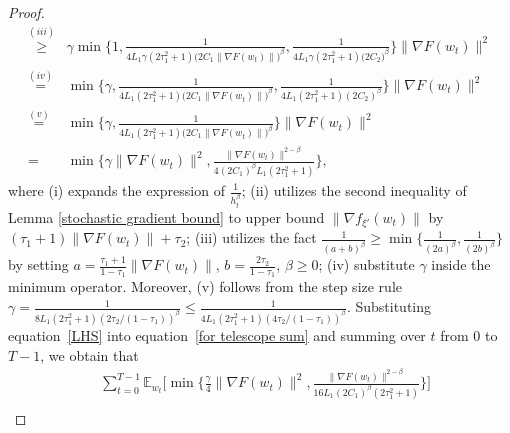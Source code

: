 \documentclass[10pt]{article} %
\def\eqref#1{equation~\ref{#1}}
\newtheorem{proof}{Proof}
\begin{document}
\begin{proof}
\begin{align}
    \overset{(iii)}{\geq}& \gamma \min \Big\{1,\frac{1}{4L_1\gamma(2\tau_1^2+1) \big(2C_1\big \|\nabla F(w_t) \big \|\big)^{\beta}}, \frac{1}{4L_1\gamma(2\tau_1^2+1)\big( 2C_2\big)^{\beta}}  \Big \} \big \|\nabla F(w_t) \big \|^2 \nonumber \\
    \overset{(iv)}{=}&\min \Big \{\gamma, \frac{1}{4L_1(2\tau_1^2+1)\big(2C_1\big \|\nabla F(w_t) \big \|\big)^{\beta}}, \frac{1}{4L_1(2\tau_1^2+1)(2C_2)^{\beta}} \Big\} \big \|\nabla F(w_t) \big \|^2 \nonumber \\
    \overset{(v)}{=}& \min \Big \{\gamma, \frac{1}{4L_1(2\tau_1^2+1)\big(2C_1\big \|\nabla F(w_t) \big \|\big)^{\beta}} \Big\} \big \|\nabla F(w_t) \big \|^2 \nonumber \\
    \overset{}{=}& \min \Big \{ \gamma \big \|\nabla F(w_t) \big \|^2, \frac{\big \|\nabla F(w_t) \big \|^{2-\beta}}{4(2C_1)^{\beta} L_1(2\tau_1^2+1)}\Big \},
    \label{LHS}
\end{align}
where (i) expands the expression of $\frac{1}{h_t^{\beta}}$; (ii) utilizes the second inequality of Lemma \ref{stochastic gradient bound} to upper bound $\|\nabla f_{\xi'}(w_t) \|$ by $(\tau_1+1) \|\nabla F(w_t) \|+\tau_2$; (iii) utilizes the fact $ \frac{1}{(a+b)^{\beta}}\geq \min \{\frac{1}{(2a)^{\beta}}, \frac{1}{(2b)^{\beta}} \}$ by setting $a=\frac{\tau_1+1}{1-\tau_1}\big \|\nabla F(w_t) \big \|$, $b = \frac{2\tau_2}{1-\tau_1}$, $\beta\geq0$; (iv) substitute $\gamma$ inside the minimum operator. 
Moreover, (v) follows from the step size rule $\gamma= \frac{1}{8L_1(2\tau_1^2+1)(2\tau_2/(1-\tau_1))^{\beta}}\leq \frac{1}{4L_1(2\tau_1^2+1)(4\tau_2/(1-\tau_1))^{\beta}}$. 
Substituting \eqref{LHS} into \eqref{for telescope sum}
and summing over $t$ from $0$ to $T-1$, we obtain that
\begin{align}
        &\sum_{t=0}^{T-1} \mathbb{E}_{w_t}\Big[\min \Big \{ \frac{\gamma}{4} \big \|\nabla F(w_t) \big \|^2, \frac{\big \|\nabla F(w_t) \big \|^{2-\beta}}{16L_1(2C_1)^{\beta}(2\tau_1^2+1)}\Big \} \Big]\nonumber \\

\end{align}
\end{proof}
\end{document}
